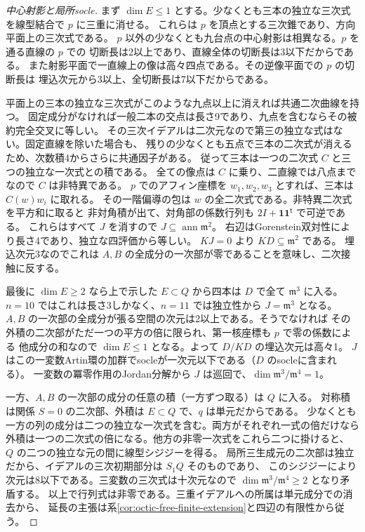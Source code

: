 \begin{proof}[中心射影と局所socle]
まず $\dim E\le1$ とする。少なくとも三本の独立な三次式を線型結合で $p$ に三重に消せる。
これらは $p$ を頂点とする三次錐であり、方向平面上の三次式である。
$p$ 以外の少なくとも九台点の中心射影は相異なる。$p$ を通る直線の $p$ での
切断長は2以上であり、直線全体の切断長は3以下だからである。
また射影平面で一直線上の像は高々四点である。その逆像平面での $p$ の切断長は
埋込次元から3以上、全切断長は7以下だからである。

平面上の三本の独立な三次式がこのような九点以上に消えれば共通二次曲線を持つ。
固定成分がなければ一般二本の交点は長さ9であり、九点を含むならその被約完全交叉に等しい。
その三次イデアルは二次元なので第三の独立な式はない。固定直線を除いた場合も、
残りの少なくとも五点で三本の二次式が消えるため、次数積4からさらに共通因子がある。
従って三本は一つの二次式 $C$ と三つの独立な一次式との積である。
全ての像点は $C$ に乗り、二直線では八点までなので $C$ は非特異である。
$p$ でのアフィン座標を $w_1,w_2,w_3$ とすれば、三本は $C(w)w_i$ に取れる。
その一階偏導の包は $w$ の全二次式である。非特異二次式を平方和に取ると
非対角積が出て、対角部の係数行列も $2I+\boldsymbol{1}\boldsymbol{1}^{\mathsf t}$ で可逆である。
これらはすべて $J$ を消すので $J\subseteq\operatorname{ann}\mathfrak m^2$。
右辺はGorenstein双対性により長さ4であり、独立な四評価から等しい。
$KJ=0$ より $K D\subseteq\mathfrak m^2$ である。
埋込次元3なのでこれは $A,B$ の全成分の一次部が零であることを意味し、二次接触に反する。

最後に $\dim E\ge2$ なら上で示した $E\subset Q$ から四本は $D$ で全て $\mathfrak m^3$ に入る。
$n=10$ ではこれは長さ3しかなく、$n=11$ では独立性から $J=\mathfrak m^3$ となる。
$A,B$ の一次部の全成分が張る空間の次元は2以上である。そうでなければ
その外積の二次部がただ一つの平方の倍に限られ、第一核座標も $p$ で零の係数による
他成分の和なので $\dim E\le1$ となる。よって $D/KD$ の埋込次元は高々1。
$J$ はこの一変数Artin環の加群でsocleが一次元以下である（$D$ のsocleに含まれる）。
一変数の冪零作用のJordan分解から $J$ は巡回で、$\dim\mathfrak m^3/\mathfrak m^4=1$。

一方、$A,B$ の一次部の成分の任意の積（一方ずつ取る）は $Q$ に入る。
対称積は関係 $S=0$ の二次部、外積は $E\subset Q$ で、$q$ は単元だからである。
少なくとも一方の列の成分は二つの独立な一次式を含む。両方がそれぞれ一式の倍だけなら
外積は一つの二次式の倍になる。他方の非零一次式をこれら二つに掛けると、
$Q$ の二つの独立な元の間に線型シジジーを得る。
局所三生成元の二次部は独立だから、イデアルの三次初期部分は $S_1Q$ そのものであり、
このシジジーにより次元は8以下である。三変数の三次式は十次元なので
$\dim\mathfrak m^3/\mathfrak m^4\ge2$ となり矛盾する。
以上で行列式は非零である。三重イデアルへの所属は単元成分での消去から、
延長の主張は系\ref{cor:octic-free-finite-extension}と四辺の有限性から従う。
\end{proof}
